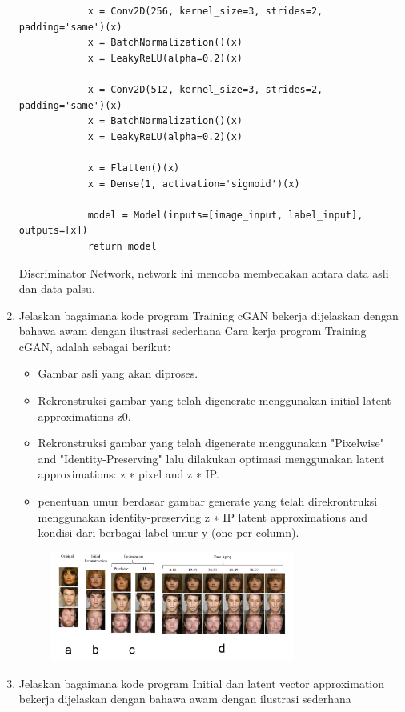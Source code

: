 \begin{enumerate}
\begin{lstlisting}
            x = Conv2D(256, kernel_size=3, strides=2, padding='same')(x)
            x = BatchNormalization()(x)
            x = LeakyReLU(alpha=0.2)(x)

            x = Conv2D(512, kernel_size=3, strides=2, padding='same')(x)
            x = BatchNormalization()(x)
            x = LeakyReLU(alpha=0.2)(x)

            x = Flatten()(x)
            x = Dense(1, activation='sigmoid')(x)

            model = Model(inputs=[image_input, label_input], outputs=[x])
            return model
    \end{lstlisting}
    Discriminator Network, network ini mencoba membedakan antara data asli dan data palsu.
    \item Jelaskan bagaimana kode program Training cGAN bekerja dijelaskan dengan bahawa awam dengan ilustrasi sederhana
    Cara kerja program Training cGAN, adalah sebagai berikut:
    \begin{itemize}
        \item Gambar asli yang akan diproses.
        \item Rekronstruksi gambar yang telah digenerate menggunakan initial latent approximations z0.
        \item Rekronstruksi gambar yang telah digenerate menggunakan "Pixelwise" and "Identity-Preserving" lalu dilakukan optimasi menggunakan latent approximations: z ∗ pixel and z ∗ IP.
        \item penentuan umur berdasar gambar generate yang telah direkrontruksi menggunakan identity-preserving z ∗ IP latent approximations and kondisi dari berbagai label umur y (one per column).
    \end{itemize}
	\begin{figure}[H]
		\includegraphics[width=8cm]{figures/1174006/chapter9/praktek/proses.png}
		\centering
	\end{figure}
    \item Jelaskan bagaimana kode program Initial dan latent vector approximation bekerja dijelaskan dengan bahawa awam dengan ilustrasi sederhana
    \begin{itemize}

\end{itemize}
\end{enumerate}
